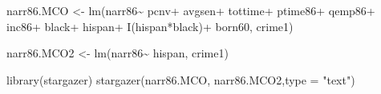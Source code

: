 \documentclass[
  letterpaper,
  DIV=11,
  numbers=noendperiod]{scrreprt}
\newenvironment{Shaded}{\begin{snugshade}}{\end{snugshade}}
\newcommand{\AttributeTok}[1]{\textcolor[rgb]{0.40,0.45,0.13}{#1}}
\newcommand{\FunctionTok}[1]{\textcolor[rgb]{0.28,0.35,0.67}{#1}}
\newcommand{\NormalTok}[1]{\textcolor[rgb]{0.00,0.23,0.31}{#1}}
\newcommand{\OtherTok}[1]{\textcolor[rgb]{0.00,0.23,0.31}{#1}}
\newcommand{\SpecialCharTok}[1]{\textcolor[rgb]{0.37,0.37,0.37}{#1}}
\newcommand{\StringTok}[1]{\textcolor[rgb]{0.13,0.47,0.30}{#1}}
\begin{document}
\begin{Shaded}
\begin{Highlighting}[]
\NormalTok{narr86.MCO }\OtherTok{\textless{}{-}} \FunctionTok{lm}\NormalTok{(narr86}\SpecialCharTok{\textasciitilde{}}
\NormalTok{                   pcnv}\SpecialCharTok{+}
\NormalTok{                   avgsen}\SpecialCharTok{+}
\NormalTok{                   tottime}\SpecialCharTok{+}
\NormalTok{                   ptime86}\SpecialCharTok{+}
\NormalTok{                   qemp86}\SpecialCharTok{+}
\NormalTok{                   inc86}\SpecialCharTok{+}
\NormalTok{                   black}\SpecialCharTok{+}
\NormalTok{                   hispan}\SpecialCharTok{+}
                   \FunctionTok{I}\NormalTok{(hispan}\SpecialCharTok{*}\NormalTok{black)}\SpecialCharTok{+}
\NormalTok{                   born60,}
\NormalTok{                 crime1)}

\NormalTok{narr86.MCO2 }\OtherTok{\textless{}{-}} \FunctionTok{lm}\NormalTok{(narr86}\SpecialCharTok{\textasciitilde{}}
\NormalTok{                   hispan,}
\NormalTok{                 crime1)}

\FunctionTok{library}\NormalTok{(stargazer)}
\FunctionTok{stargazer}\NormalTok{(narr86.MCO, narr86.MCO2,}\AttributeTok{type =} \StringTok{"text"}\NormalTok{)}
\end{Highlighting}
\end{Shaded}
\end{document}
